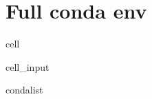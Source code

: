 \documentclass[letterpaper,table,10pt,english]{jupyterBook}
\begin{document}
\section{Full conda env}
\label{\detokenize{tests/build_versions_checks:full-conda-env}}
\begin{sphinxuseclass}{cell}\begin{sphinxVerbatimInput}

\begin{sphinxuseclass}{cell_input}
\begin{sphinxVerbatim}[commandchars=\\\{\}]
condalist
\end{sphinxVerbatim}

\end{sphinxuseclass}\end{sphinxVerbatimInput}
\begin{sphinxVerbatimOutput}


\end{sphinxVerbatimOutput}
\end{sphinxuseclass}
\end{document}
